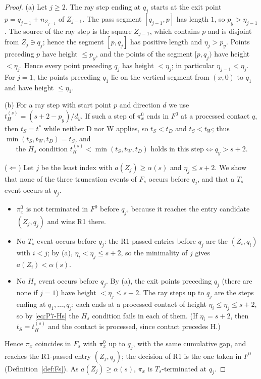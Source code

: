 \documentclass[11pt]{amsart}
\newcommand{\Fz}{F^{0}}
\newcommand{\Fs}{F_{s}}
\theoremstyle{definition}
\theoremstyle{remark}
\numberwithin{equation}{section}
\begin{document}
\begin{proof}
(a) Let $j\ge2$. The ray step ending at $q_j$ starts at the exit point $p=q_{j-1}+n_{Z_{j-1}}$ of $Z_{j-1}$. The pass segment $[q_{j-1},p]$ has length $1$, so $p_y>\eta_{j-1}$. The source of the ray step is the square $Z_{j-1}$, which contains $p$ and is disjoint from $Z_j\ni q_j$; hence the segment $[p,q_j]$ has positive length and $\eta_j>p_y$. Points preceding $p$ have height $\le p_y$, and the points of the segment $[p,q_j)$ have height $<\eta_j$. Hence every point preceding $q_j$ has height $<\eta_j$; in particular $\eta_{j-1}<\eta_j$. For $j=1$, the points preceding $q_1$ lie on the vertical segment from $(x,0)$ to $q_1$ and have height $\le\eta_1$.

(b) For a ray step with start point $p$ and direction $d$ we use $t_H^{(s)}=(s+2-p_y)/d_y$. If such a step of $\pi^0_x$ ends in $\Fz$ at a processed contact $q$, then $t_S=t^*$ while neither D nor W applies, so $t_S<t_D$ and $t_S<t_W$; thus $\min(t_S,t_W,t_D)=t_S$, and
\begin{equation}\label{eq:P7-Hs}
\text{the $H_s$ condition $t_H^{(s)}<\min(t_S,t_W,t_D)$ holds in this step}\iff q_y>s+2 .
\end{equation}

($\Leftarrow$) Let $j$ be the least index with $a(Z_j)\ge\alpha(s)$ and $\eta_j\le s+2$. We show that none of the three truncation events of $\Fs$ occurs before $q_j$, and that a $T_s$ event occurs at $q_j$.
\begin{itemize}
\item $\pi^0_x$ is not terminated in $\Fz$ before $q_j$, because it reaches the entry candidate $(Z_j,q_j)$ and wins R1 there.
\item No $T_s$ event occurs before $q_j$: the R1-passed entries before $q_j$ are the $(Z_i,q_i)$ with $i<j$; by (a), $\eta_i<\eta_j\le s+2$, so the minimality of $j$ gives $a(Z_i)<\alpha(s)$.
\item No $H_s$ event occurs before $q_j$. By (a), the exit points preceding $q_j$ (there are none if $j=1$) have height $<\eta_j\le s+2$. The ray steps up to $q_j$ are the steps ending at $q_1,\dots,q_j$; each ends at a processed contact of height $\eta_i\le\eta_j\le s+2$, so by \eqref{eq:P7-Hs} the $H_s$ condition fails in each of them. (If $\eta_i=s+2$, then $t_S=t_H^{(s)}$ and the contact is processed, since contact precedes H.)
\end{itemize}
Hence $\pi_x$ coincides in $\Fs$ with $\pi^0_x$ up to $q_j$, with the same cumulative gap, and reaches the R1-passed entry $(Z_j,q_j)$; the decision of R1 is the one taken in $\Fz$ (Definition~\ref{def:Fs}). As $a(Z_j)\ge\alpha(s)$, $\pi_x$ is $T_s$-terminated at $q_j$.


\end{proof}
\end{document}
